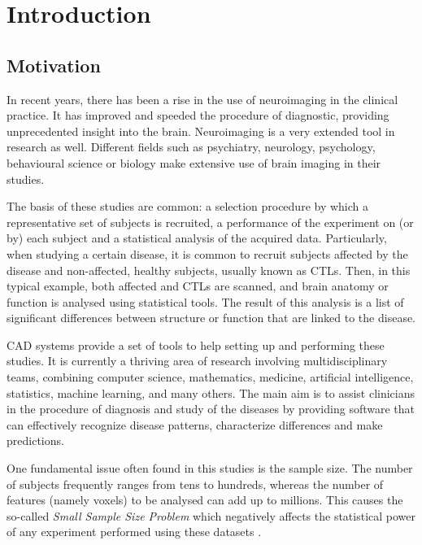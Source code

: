 \chapter{Introduction}\label{ch:introduction}
\section{Motivation}
In recent years, there has been a rise in the use of neuroimaging in the clinical practice. It has improved and speeded the procedure of diagnostic, providing unprecedented insight into the brain. Neuroimaging is a very extended tool in research as well. Different fields such as psychiatry, neurology, psychology, behavioural science or biology make extensive use of brain imaging in their studies. 

The basis of these studies are common: a selection procedure by which a representative set of subjects is recruited, a performance of the experiment on (or by) each subject and a statistical analysis of the acquired data. Particularly, when studying a certain disease, it is common to recruit subjects affected by the disease and non-affected, healthy subjects, usually known as \acp{CTL}. Then, in this typical example, both affected and \acp{CTL} are scanned, and brain anatomy or function is analysed using statistical tools. The result of this analysis is a list of significant differences between structure or function that are linked to the disease. 

\ac{CAD} systems provide a set of tools to help setting up and performing these studies. It is currently a thriving area of research involving multidisciplinary teams, combining computer science, mathematics, medicine, artificial intelligence, statistics, machine learning, and many others. The main aim is to assist clinicians in the procedure of diagnosis and study of the diseases by providing software that can effectively recognize disease patterns, characterize differences and make predictions. 
\cite{Martinez-Murcia2016}

One fundamental issue often found in this studies is the sample size. The number of subjects frequently ranges from tens to hundreds, whereas the number of features (namely voxels) to be analysed can add up to millions. This causes the so-called \emph{Small Sample Size Problem} \cite{Duin2000} which negatively affects the statistical power of any experiment performed using these datasets \cite{Button2013}. 

